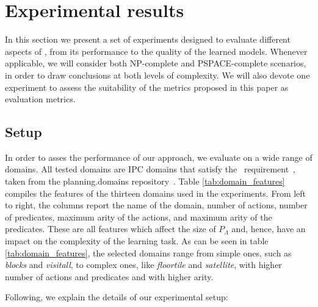 
\section{Experimental results}
\label{sec:experiments}

In this section we present a set of experiments designed to evaluate different aspects of \FAMA, from its performance to the quality of the learned models. Whenever applicable, we will consider both NP-complete and PSPACE-complete scenarios, in order to draw conclusions at both levels of complexity. We will also devote one experiment to assess the suitability of the metrics proposed in this paper as evaluation metrics. 

\subsection{Setup}
In order to asses the performance of our approach, we evaluate \FAMA on a wide range of domains. All tested domains are IPC domains that satisfy the \strips\ requirement~\cite{fox2003pddl2}, taken from the {\sc planning.domains} repository~\cite{muise2016planning}. Table \ref{tab:domain_features} compiles the features of the thirteen domains used in the experiments. From left to right, the columns report the name of the domain, number of actions, number of predicates, maximum arity of the actions, and maximum arity of the predicates. These are all features which affect the size of $P_\Lambda$ and, hence, have an impact on the complexity of the learning task. As can be seen in table \ref{tab:domain_features}, the selected domains range from simple ones, such as \emph{blocks} and \emph{visitall}, to complex ones, like \emph{floortile} and \emph{satellite}, with higher number of actions and predicates and with higher arity.

Following, we explain the details of our experimental setup:

